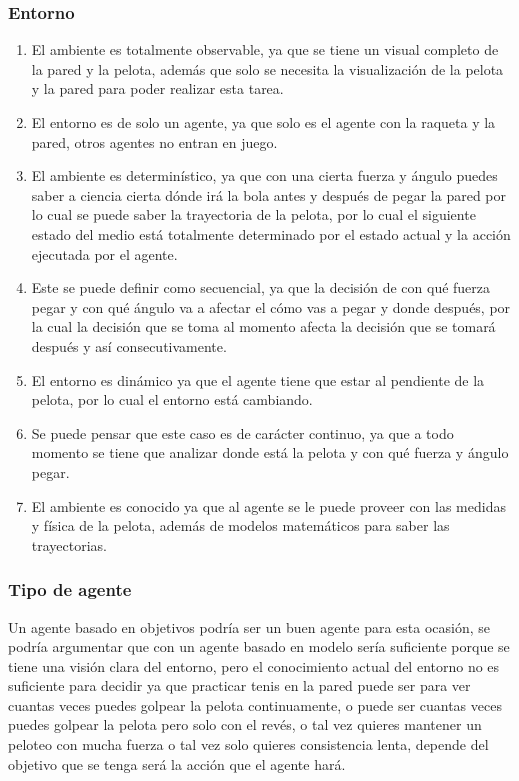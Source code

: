 \documentclass{article}
\begin{document}
            \subsubsection{Entorno}
                \begin{enumerate}
                    \item El ambiente es totalmente observable, ya que se tiene un visual completo de la pared y la pelota, además que solo se necesita la visualización de la pelota y la pared para poder realizar esta tarea. 
                    \item El entorno es de solo un agente, ya que solo es el agente con la raqueta y la pared, otros agentes no entran en juego.
                    \item El ambiente es determinístico, ya que con una cierta fuerza y ángulo puedes saber a ciencia cierta dónde irá la bola antes y después de pegar la pared por lo cual se puede saber la trayectoria de la pelota, por lo cual el siguiente estado del medio está totalmente determinado por el estado actual y la acción ejecutada por el agente.
                    \item Este se puede definir como secuencial, ya que la decisión de con qué fuerza pegar y con qué ángulo va a afectar el cómo vas a pegar y donde después, por la cual la decisión que se toma al momento afecta la decisión que se tomará después y así consecutivamente.
                    \item El entorno es dinámico ya que el agente tiene que estar al pendiente de la pelota, por lo cual el entorno está cambiando.
                    \item Se puede pensar que este caso es de carácter continuo, ya que a todo momento se tiene que analizar donde está la pelota y con qué fuerza y ángulo pegar.
                    \item El ambiente es conocido ya que al agente se le puede proveer con las medidas y física de la pelota, además de modelos matemáticos para saber las trayectorias.
                \end{enumerate}

            \subsubsection{Tipo de agente}
                Un agente basado en objetivos podría ser un buen agente para esta ocasión, se podría argumentar que con un agente basado en modelo sería suficiente porque se tiene una visión clara del entorno, pero el conocimiento actual del entorno no es suficiente para decidir ya que practicar tenis en la pared puede ser para ver cuantas veces puedes golpear la pelota continuamente, o puede ser cuantas veces puedes golpear la pelota pero solo con el revés, o tal vez quieres mantener un peloteo con mucha fuerza o tal vez solo quieres consistencia lenta, depende del objetivo que se tenga será la acción que el agente hará.
                
\end{document}
